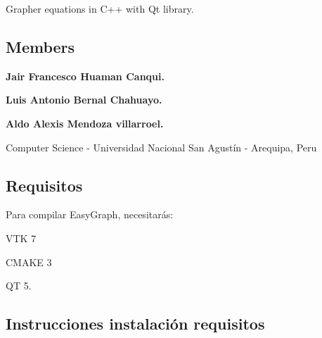 Grapher equations in C++ with Qt library.





\subsection*{Members }


\begin{DoxyItemize}
\item {\bfseries Jair Francesco Huaman Canqui.}
\item {\bfseries Luis Antonio Bernal Chahuayo.}
\item {\bfseries Aldo Alexis Mendoza villarroel.}
\end{DoxyItemize}

Computer Science -\/ Universidad Nacional San Agustín -\/ Arequipa, Peru



 \subsection*{Requisitos}

Para compilar Easy\+Graph, necesitarás\+:
\begin{DoxyItemize}
\item V\+TK 7
\item C\+M\+A\+KE 3
\item QT 5.
\end{DoxyItemize}

\subsection*{Instrucciones instalación requisitos}


